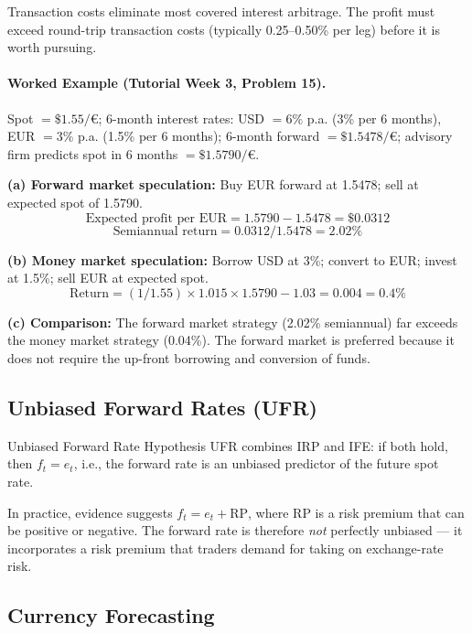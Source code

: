 \documentclass[11pt,a4paper]{article}
\begin{document}
\begin{tipbox}
Transaction costs eliminate most covered interest arbitrage. The profit must exceed round-trip transaction costs (typically 0.25--0.50\% per leg) before it is worth pursuing.
\end{tipbox}

\paragraph{Worked Example (Tutorial Week 3, Problem 15).}

Spot $= \$1.55/\text{€}$; 6-month interest rates: USD $= 6\%$ p.a. (3\% per 6 months), EUR $= 3\%$ p.a. (1.5\% per 6 months); 6-month forward $= \$1.5478/\text{€}$; advisory firm predicts spot in 6 months $= \$1.5790/\text{€}$.

\textbf{(a) Forward market speculation:} Buy EUR forward at 1.5478; sell at expected spot of 1.5790.
\[
  \text{Expected profit per EUR} = 1.5790 - 1.5478 = \$0.0312
\]
\[
  \text{Semiannual return} = 0.0312 / 1.5478 = 2.02\%
\]

\textbf{(b) Money market speculation:} Borrow USD at 3\%; convert to EUR; invest at 1.5\%; sell EUR at expected spot.
\[
  \text{Return} = (1/1.55) \times 1.015 \times 1.5790 - 1.03 = 0.004 = 0.4\%
\]

\textbf{(c) Comparison:} The forward market strategy (2.02\% semiannual) far exceeds the money market strategy (0.04\%). The forward market is preferred because it does not require the up-front borrowing and conversion of funds.

\subsection{Unbiased Forward Rates (UFR)}

\begin{conceptbox}{Unbiased Forward Rate Hypothesis}
UFR combines IRP and IFE: if both hold, then $f_t = e_t$, i.e., the forward rate is an unbiased predictor of the future spot rate.

In practice, evidence suggests $f_t = e_t + \text{RP}$, where RP is a risk premium that can be positive or negative. The forward rate is therefore \textit{not} perfectly unbiased --- it incorporates a risk premium that traders demand for taking on exchange-rate risk.
\end{conceptbox}

\subsection{Currency Forecasting}
\end{document}
